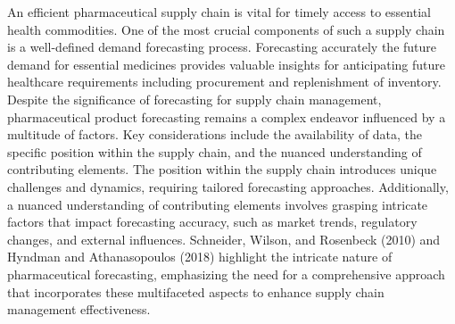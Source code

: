 \documentclass[
  authoryear,
  preprint,
  3p]{elsarticle}
\begin{document}
An efficient pharmaceutical supply chain is vital for timely access to
essential health commodities. One of the most crucial components of such
a supply chain is a well-defined demand forecasting process. Forecasting
accurately the future demand for essential medicines provides valuable
insights for anticipating future healthcare requirements including
procurement and replenishment of
inventory\citep{subramanian2021effective}. Despite the significance of
forecasting for supply chain management, pharmaceutical product
forecasting remains a complex endeavor influenced by a multitude of
factors. Key considerations include the availability of data, the
specific position within the supply chain, and the nuanced understanding
of contributing elements. The position within the supply chain
introduces unique challenges and dynamics, requiring tailored
forecasting approaches. Additionally, a nuanced understanding of
contributing elements involves grasping intricate factors that impact
forecasting accuracy, such as market trends, regulatory changes, and
external influences. Schneider, Wilson, and Rosenbeck (2010) and Hyndman
and Athanasopoulos (2018) highlight the intricate nature of
pharmaceutical forecasting, emphasizing the need for a comprehensive
approach that incorporates these multifaceted aspects to enhance supply
chain management
effectiveness\citep{schneider2010pharmaceutical, hyndman2018forecasting}.
\end{document}
